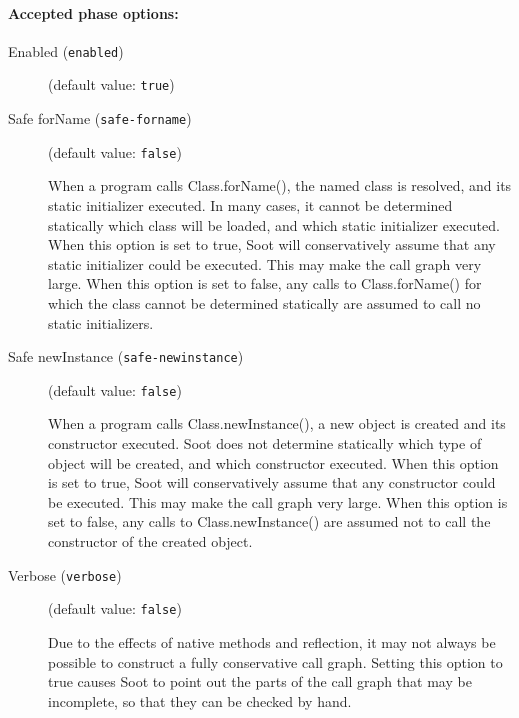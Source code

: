 \documentclass{article}
\begin{document}
\paragraph{Accepted phase options:} 

\begin{description}

\item[Enabled ({\tt enabled})]
(default value: {\tt true})






\item[Safe forName ({\tt safe-forname})]
(default value: {\tt false})



When a program calls
Class.forName(), the named class is resolved, and its static initializer
executed. In many cases, it cannot be determined statically which
class will be loaded, and which static initializer executed. When this
option is set to true, Soot will conservatively assume that any static
initializer could be executed. This may make the call graph very large.
When this option is set to false, any calls to Class.forName() for which
the class cannot be determined statically are assumed to call no
static initializers.



\item[Safe newInstance ({\tt safe-newinstance})]
(default value: {\tt false})



When a program calls
Class.newInstance(), a new object is created and its constructor
executed. Soot does not determine statically which
type of object will be created, and which constructor executed. When this
option is set to true, Soot will conservatively assume that any constructor
could be executed. This may make the call graph very large.
When this option is set to false, any calls to Class.newInstance()
are assumed not to call the constructor of the created object.



\item[Verbose ({\tt verbose})]
(default value: {\tt false})



Due to the effects of native methods and reflection, it may not always be possible to construct a fully conservative call graph. Setting this option to true causes Soot to point out the parts of the call graph that may be incomplete, so that they can be checked by hand.
                                        



\end{description}
\end{document}
